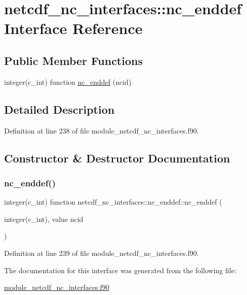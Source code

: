 \hypertarget{interfacenetcdf__nc__interfaces_1_1nc__enddef}{}\section{netcdf\+\_\+nc\+\_\+interfaces\+:\+:nc\+\_\+enddef Interface Reference}
\label{interfacenetcdf__nc__interfaces_1_1nc__enddef}
\subsection*{Public Member Functions}
\begin{DoxyCompactItemize}
\item 
integer(c\+\_\+int) function \hyperlink{interfacenetcdf__nc__interfaces_1_1nc__enddef_a1f64ffb55348a49e98bb701c7fdff76c}{nc\+\_\+enddef} (ncid)
\end{DoxyCompactItemize}


\subsection{Detailed Description}


Definition at line 238 of file module\+\_\+netcdf\+\_\+nc\+\_\+interfaces.\+f90.



\subsection{Constructor \& Destructor Documentation}
\mbox{\label{interfacenetcdf__nc__interfaces_1_1nc__enddef_a1f64ffb55348a49e98bb701c7fdff76c}} 
\subsubsection{\texorpdfstring{nc\+\_\+enddef()}{nc\_enddef()}}
{\footnotesize\ttfamily integer(c\+\_\+int) function netcdf\+\_\+nc\+\_\+interfaces\+::nc\+\_\+enddef\+::nc\+\_\+enddef (\begin{DoxyParamCaption}\item[{integer(c\+\_\+int), value}]{ncid }\end{DoxyParamCaption})}



Definition at line 239 of file module\+\_\+netcdf\+\_\+nc\+\_\+interfaces.\+f90.



The documentation for this interface was generated from the following file\+:\begin{DoxyCompactItemize}
\item 
\hyperlink{module__netcdf__nc__interfaces_8f90}{module\+\_\+netcdf\+\_\+nc\+\_\+interfaces.\+f90}\end{DoxyCompactItemize}
